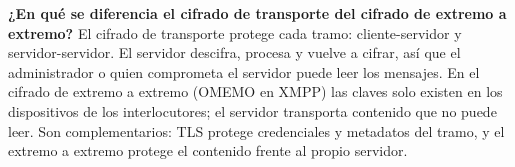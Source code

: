 \textbf{¿En qué se diferencia el cifrado de transporte del cifrado de extremo a extremo?} El cifrado de transporte protege cada tramo: cliente-servidor y servidor-servidor. El servidor descifra, procesa y vuelve a cifrar, así que el administrador o quien comprometa el servidor puede leer los mensajes. En el cifrado de extremo a extremo (OMEMO en XMPP) las claves solo existen en los dispositivos de los interlocutores; el servidor transporta contenido que no puede leer. Son complementarios: TLS protege credenciales y metadatos del tramo, y el extremo a extremo protege el contenido frente al propio servidor.